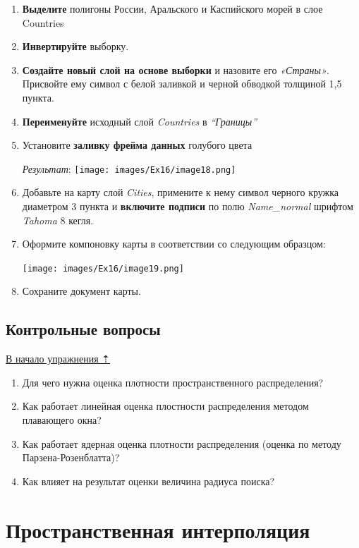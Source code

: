\documentclass[12pt,]{book}
\begin{document}
\begin{enumerate}
\def\labelenumi{\arabic{enumi}.}
\item
  \textbf{Выделите} полигоны России, Аральского и Каспийского морей в слое Countries
\item
  \textbf{Инвертируйте} выборку.
\item
  \textbf{Создайте новый слой на основе выборки} и назовите его \emph{«Страны»}. Присвойте ему символ с белой заливкой и черной обводкой толщиной 1,5 пункта.
\item
  \textbf{Переименуйте} исходный слой \emph{Countries} в \emph{``Границы''}
\item
  Установите \textbf{заливку фрейма данных} голубого цвета

  \emph{Результат}:
  \texttt{[image: images/Ex16/image18.png]}
\item
  Добавьте на карту слой \emph{Cities}, примените к нему символ черного кружка диаметром 3 пункта и \textbf{включите подписи} по полю \emph{Name\_normal} шрифтом \emph{Tahoma} 8 кегля.
\item
  Оформите компоновку карты в соответствии со следующим образцом:

  \texttt{[image: images/Ex16/image19.png]}
\item
  Сохраните документ карты.
\end{enumerate}

\hypertarget{density-analysis-questions}{%
\section{Контрольные вопросы}\label{density-analysis-questions}}

\protect\hyperlink{density-analysis}{В начало упражнения ⇡}

\begin{enumerate}
\def\labelenumi{\arabic{enumi}.}
\item
  Для чего нужна оценка плотности пространственного распределения?
\item
  Как работает линейная оценка плостности распределения методом плавающего окна?
\item
  Как работает ядерная оценка плотности распределения (оценка по методу Парзена-Розенблатта)?
\item
  Как влияет на результат оценки величина радиуса поиска?
\end{enumerate}

\hypertarget{interpolation}{%
\chapter{Пространственная интерполяция}\label{interpolation}}
\end{document}
